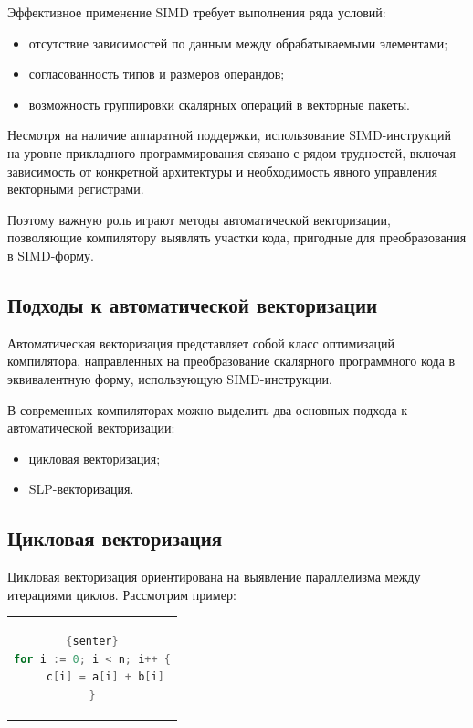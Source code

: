Эффективное применение SIMD требует выполнения ряда условий:
\begin{itemize}
    \item отсутствие зависимостей по данным между обрабатываемыми элементами;
    \item согласованность типов и размеров операндов;
    \item возможность группировки скалярных операций в векторные пакеты.
\end{itemize}

Несмотря на наличие аппаратной поддержки, использование SIMD-инструкций на уровне прикладного программирования связано с рядом трудностей, включая зависимость от конкретной архитектуры и необходимость явного управления векторными регистрами.

Поэтому важную роль играют методы автоматической векторизации, позволяющие компилятору выявлять участки кода, пригодные для преобразования в SIMD-форму.

\subsection{Подходы к автоматической векторизации}

Автоматическая векторизация представляет собой класс оптимизаций компилятора, направленных на преобразование скалярного программного кода в эквивалентную форму, использующую SIMD-инструкции.

В современных компиляторах можно выделить два основных подхода к автоматической векторизации:
\begin{itemize}
    \item цикловая векторизация;
    \item SLP-векторизация.
\end{itemize}

\subsection{Цикловая векторизация}

Цикловая векторизация ориентирована на выявление параллелизма между итерациями циклов. Рассмотрим пример:

\begin{center}
\begin{tabular}{c}
\begin{lstlisting}[language=Go, captionpos=b]{senter}
for i := 0; i < n; i++ {
    c[i] = a[i] + b[i]
}
\end{lstlisting}
\end{tabular}
\end{center}


